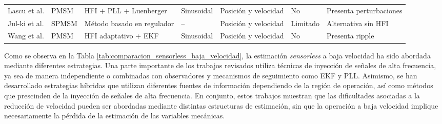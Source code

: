 \begin{table}[htbp]
\begin{adjustbox}{max width=\textwidth}
\begin{tabular}{lllllll}
        \addlinespace

        Lascu et al.\cite{lascuPLLPositionSpeed2020} &
        PMSM &
        HFI + PLL + Luenberger &
        Sinusoidal &
        Posición y velocidad &
        No &
        Presenta perturbaciones\\

        \addlinespace

        Jul-ki et al.\cite{jul-kiseokSensorlessSpeedControl2006} &
        SPMSM &
        Método basado en regulador &
        -- &
        Posición y velocidad &
        Limitado &
        Alternativa sin HFI \\

         \addlinespace

        Wang et al. \cite{wangOptimizedNonlinearHighFrequency2025} &
        PMSM &
        HFI adaptativo + EKF &
        Sinusoidal &
        Posición y velocidad &
        No &
        Presenta ripple\\

        \bottomrule
    \end{tabular}
    \end{adjustbox}
\end{table}


Como se observa en la Tabla \ref{tab:comparacion_sensorless_baja_velocidad}, la estimación \textit{sensorless} a baja velocidad ha sido abordada mediante diferentes estrategias. Una parte importante de los trabajos revisados utiliza técnicas de inyección de señales de alta frecuencia, ya sea de manera independiente o combinadas con observadores y mecanismos de seguimiento como EKF y PLL. Asimismo, se han desarrollado estrategias híbridas que utilizan diferentes fuentes de información dependiendo de la región de operación, así como métodos que prescinden de la inyección de señales de alta frecuencia. En conjunto, estos trabajos muestran que las dificultades asociadas a la reducción de velocidad pueden ser abordadas mediante distintas estructuras de estimación, sin que la operación a baja velocidad implique necesariamente la pérdida de la estimación de las variables mecánicas.

